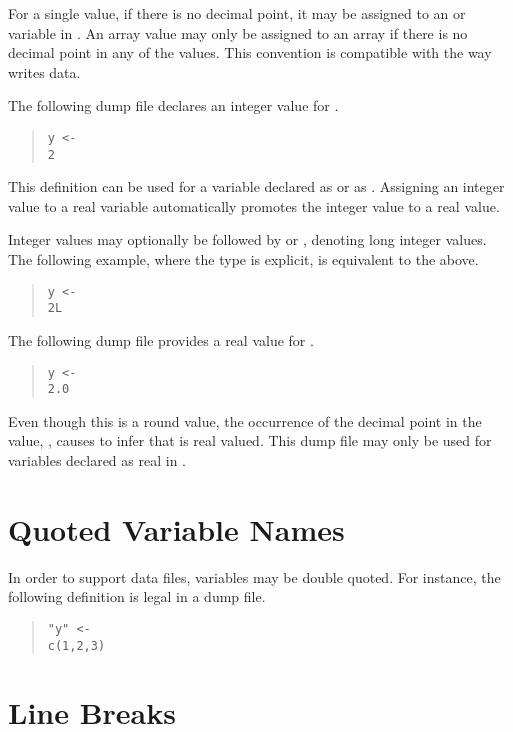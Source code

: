 For a single value, if there is no decimal point, it may be assigned
to an  or  variable in \Stan.  An array value may
only be assigned to an  array if there is no decimal point
in any of the values.  This convention is compatible with the way \R
writes data.

The following dump file declares an integer value for .
%
\begin{quote}
\begin{Verbatim} 
y <- 
2
\end{Verbatim}
\end{quote}
% 
This definition can be used for a \Stan variable  declared as
 or as .  Assigning an integer value to a real
variable automatically promotes the integer value to a real value.

Integer values may optionally be followed by  or ,
denoting long integer values.  The following example, where the type is
explicit, is equivalent to the above.
%
\begin{quote}
\begin{Verbatim} 
y <- 
2L
\end{Verbatim}
\end{quote}

The following dump file provides a real value for .
%
\begin{quote}
\begin{Verbatim}
y <-
2.0
\end{Verbatim}
\end{quote}
%
Even though this is a round value, the occurrence of the decimal
point in the value, , causes \Stan to infer that  is
real valued.  This dump file may only be used for variables 
declared as real in \Stan.


\section{Quoted Variable Names}

In order to support \JAGS data files, variables may be double quoted.
For instance, the following definition is legal in a dump file.
%
\begin{quote}
\begin{Verbatim}
"y" <-
c(1,2,3)
\end{Verbatim}
\end{quote}

\section{Line Breaks}

